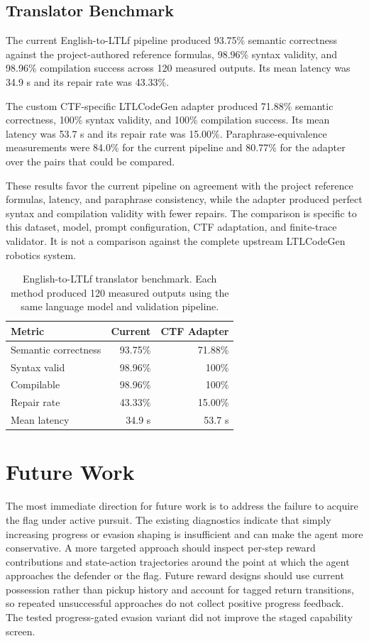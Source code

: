 \documentclass[letterpaper]{article}
\begin{document}
\subsection{Translator Benchmark}

The current English-to-LTLf pipeline produced 93.75\% semantic correctness against the project-authored reference formulas, 98.96\% syntax validity, and 98.96\% compilation success across 120 measured outputs. Its mean latency was 34.9 s and its repair rate was 43.33\%.

The custom CTF-specific LTLCodeGen adapter produced 71.88\% semantic correctness, 100\% syntax validity, and 100\% compilation success. Its mean latency was 53.7 s and its repair rate was 15.00\%. Paraphrase-equivalence measurements were 84.0\% for the current pipeline and 80.77\% for the adapter over the pairs that could be compared.

These results favor the current pipeline on agreement with the project reference formulas, latency, and paraphrase consistency, while the adapter produced perfect syntax and compilation validity with fewer repairs. The comparison is specific to this dataset, model, prompt configuration, CTF adaptation, and finite-trace validator. It is not a comparison against the complete upstream LTLCodeGen robotics system.

\begin{table}[htbp]
\centering
\small
\begin{tabular}{lrr}
\hline
Metric & Current & CTF Adapter \\
\hline
Semantic correctness & 93.75\% & 71.88\% \\
Syntax valid & 98.96\% & 100\% \\
Compilable & 98.96\% & 100\% \\
Repair rate & 43.33\% & 15.00\% \\
Mean latency & 34.9 s & 53.7 s \\
\hline
\end{tabular}
\caption{English-to-LTLf translator benchmark. Each method produced 120 measured outputs using the same language model and validation pipeline.}
\label{tab:translator}
\end{table}

\section{Future Work}

The most immediate direction for future work is to address the failure to acquire the flag under active pursuit. The existing diagnostics indicate that simply increasing progress or evasion shaping is insufficient and can make the agent more conservative. A more targeted approach should inspect per-step reward contributions and state-action trajectories around the point at which the agent approaches the defender or the flag. Future reward designs should use current possession rather than pickup history and account for tagged return transitions, so repeated unsuccessful approaches do not collect positive progress feedback. The tested progress-gated evasion variant did not improve the staged capability screen.
\end{document}

